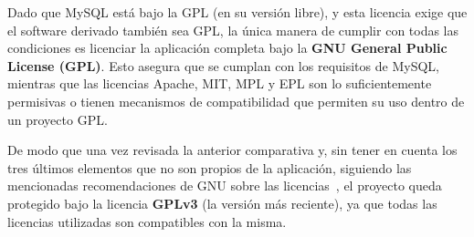Dado que MySQL está bajo la GPL (en su versión libre), y esta licencia exige que el software derivado también sea GPL, la única manera de cumplir con todas las condiciones es licenciar la aplicación completa bajo la \textbf{GNU General Public License (GPL)}. Esto asegura que se cumplan con los requisitos de MySQL, mientras que las licencias Apache, MIT, MPL y EPL son lo suficientemente permisivas o tienen mecanismos de compatibilidad que permiten su uso dentro de un proyecto GPL.

De modo que una vez revisada la anterior comparativa y, sin tener en cuenta los tres últimos elementos que no son propios de la aplicación, siguiendo las mencionadas recomendaciones de GNU sobre las licencias~\cite{gnu}, el proyecto queda protegido bajo la licencia \textbf{GPLv3} (la versión más reciente), ya que todas las licencias utilizadas son compatibles con la misma.
